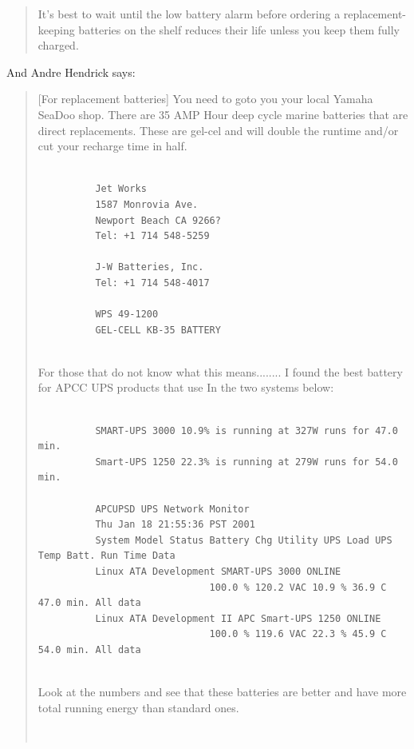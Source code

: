 {{{{{{{{{\begin{quote}
It's best to wait until the low battery alarm before ordering a
replacement-keeping batteries on the shelf reduces their life unless you keep
them fully charged. 
\end{quote}

And Andre Hendrick says:  

\begin{quote}

[For replacement batteries] You need to goto you your local Yamaha SeaDoo
shop. There are 35 AMP Hour deep cycle marine batteries that are direct
replacements. These are gel-cel and will double the runtime and/or cut your
recharge time in half.  

\footnotesize
\begin{verbatim}
          
          Jet Works
          1587 Monrovia Ave.
          Newport Beach CA 9266?
          Tel: +1 714 548-5259
          
          J-W Batteries, Inc.
          Tel: +1 714 548-4017
          
          WPS 49-1200
          GEL-CELL KB-35 BATTERY
     
\end{verbatim}
\normalsize

For those that do not know what this means........ I found the best battery
for APCC UPS products that use In the two systems below:  

\footnotesize
\begin{verbatim}
          
          SMART-UPS 3000 10.9% is running at 327W runs for 47.0 min.
          Smart-UPS 1250 22.3% is running at 279W runs for 54.0 min.
          
          APCUPSD UPS Network Monitor
          Thu Jan 18 21:55:36 PST 2001
          System Model Status Battery Chg Utility UPS Load UPS Temp Batt. Run Time Data
          Linux ATA Development SMART-UPS 3000 ONLINE
                              100.0 % 120.2 VAC 10.9 % 36.9 C 47.0 min. All data
          Linux ATA Development II APC Smart-UPS 1250 ONLINE
                              100.0 % 119.6 VAC 22.3 % 45.9 C 54.0 min. All data
     
\end{verbatim}
\normalsize

Look at the numbers and see that these batteries are better and have more
total running energy than standard ones.  

\footnotesize
\begin{verbatim}
          

\end{verbatim}
\end{quote}}}}}}}}}}
